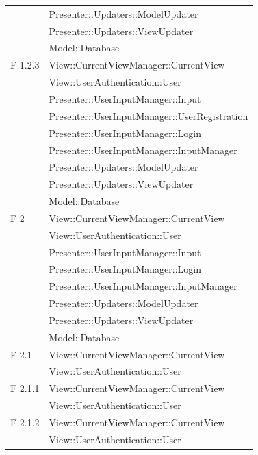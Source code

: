 \documentclass[a4paper,11pt]{article}
\begin{document}
\begin{longtable}{p{}p{}}
			& Presenter::Updaters::ModelUpdater\\
			& Presenter::Updaters::ViewUpdater\\
			& Model::Database\\
\midrule
F 1.2.3 & View::CurrentViewManager::CurrentView\\
			& View::UserAuthentication::User\\
			& Presenter::UserInputManager::Input\\
			& Presenter::UserInputManager::UserRegistration\\
			& Presenter::UserInputManager::Login\\
			& Presenter::UserInputManager::InputManager\\
			& Presenter::Updaters::ModelUpdater\\
			& Presenter::Updaters::ViewUpdater\\
			& Model::Database\\
\midrule
F 2 & View::CurrentViewManager::CurrentView\\
			& View::UserAuthentication::User\\
			& Presenter::UserInputManager::Input\\
			& Presenter::UserInputManager::Login\\
			& Presenter::UserInputManager::InputManager\\
			& Presenter::Updaters::ModelUpdater\\
			& Presenter::Updaters::ViewUpdater\\
			& Model::Database\\
\midrule
F 2.1 	& View::CurrentViewManager::CurrentView\\
			& View::UserAuthentication::User\\
\midrule
F 2.1.1 	& View::CurrentViewManager::CurrentView\\
			& View::UserAuthentication::User\\
\midrule
F 2.1.2 	& View::CurrentViewManager::CurrentView\\
			& View::UserAuthentication::User\\
\midrule




\end{longtable}
\end{document}
